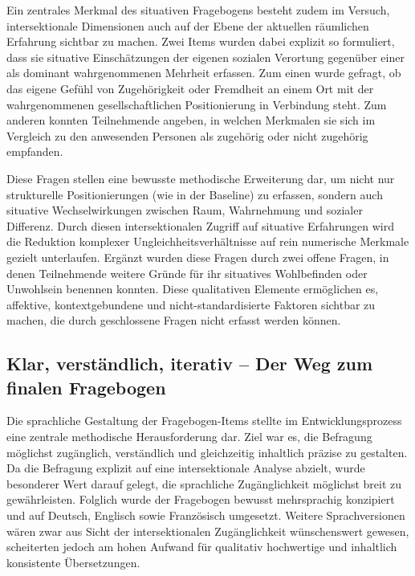 Ein zentrales Merkmal des situativen Fragebogens besteht zudem im Versuch, intersektionale Dimensionen auch auf der Ebene der aktuellen räumlichen Erfahrung sichtbar zu machen. Zwei Items wurden dabei explizit so formuliert, dass sie situative Einschätzungen der eigenen sozialen Verortung gegenüber einer als dominant wahrgenommenen Mehrheit erfassen. Zum einen wurde gefragt, ob das eigene Gefühl von Zugehörigkeit oder Fremdheit an einem Ort mit der wahrgenommenen gesellschaftlichen Positionierung in Verbindung steht. Zum anderen konnten Teilnehmende angeben, in welchen Merkmalen sie sich im Vergleich zu den anwesenden Personen als zugehörig oder nicht zugehörig empfanden.

Diese Fragen stellen eine bewusste methodische Erweiterung dar, um nicht nur strukturelle Positionierungen (wie in der Baseline) zu erfassen, sondern auch situative Wechselwirkungen zwischen Raum, Wahrnehmung und sozialer Differenz. Durch diesen intersektionalen Zugriff auf situative Erfahrungen wird die Reduktion komplexer Ungleichheitsverhältnisse auf rein numerische Merkmale gezielt unterlaufen. Ergänzt wurden diese Fragen durch zwei offene Fragen, in denen Teilnehmende weitere Gründe für ihr situatives Wohlbefinden oder Unwohlsein benennen konnten. Diese qualitativen Elemente ermöglichen es, affektive, kontextgebundene und nicht-standardisierte Faktoren sichtbar zu machen, die durch geschlossene Fragen nicht erfasst werden können.

\subsection{Klar, verständlich, iterativ -- Der Weg zum finalen Fragebogen}

Die sprachliche Gestaltung der Fragebogen-Items stellte im Entwicklungsprozess eine zentrale methodische Herausforderung dar. Ziel war es, die Befragung möglichst zugänglich, verständlich und gleichzeitig inhaltlich präzise zu gestalten. Da die Befragung explizit auf eine intersektionale Analyse abzielt, wurde besonderer Wert darauf gelegt, die sprachliche Zugänglichkeit möglichst breit zu gewährleisten. Folglich wurde der Fragebogen bewusst mehrsprachig konzipiert und auf Deutsch, Englisch sowie Französisch umgesetzt. Weitere Sprachversionen wären zwar aus Sicht der intersektionalen Zugänglichkeit wünschenswert gewesen, scheiterten jedoch am hohen Aufwand für qualitativ hochwertige und inhaltlich konsistente Übersetzungen.


